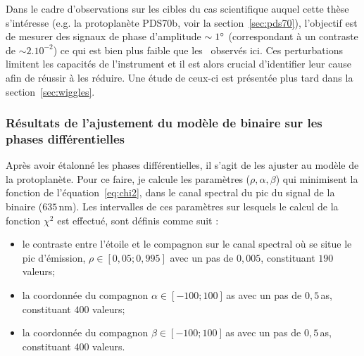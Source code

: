 Dans le cadre d'observations sur les cibles du cas scientifique auquel cette thèse s'intéresse (e.g. la protoplanète PDS70b, voir la section~\ref{sec:pds70}), l'objectif est de mesurer des signaux de phase d'amplitude $\sim 1^{\circ}$ (correspondant à un contraste de $\sim 2.10^{-2}$) ce qui est bien plus faible que les \wiggles~observés ici. Ces perturbations limitent les capacités de l'instrument et il est alors crucial d'identifier leur cause afin de réussir à les réduire. Une étude de ceux-ci est présentée plus tard dans la section~\ref{sec:wiggles}.


\subsubsection{Résultats de l'ajustement du modèle de binaire sur les phases différentielles}

Après avoir étalonné les phases différentielles, il s'agit de les ajuster au modèle de la protoplanète. Pour ce faire, je calcule les paramètres ($\rho, \alpha, \beta$) qui minimisent la fonction de l'équation~\ref{eq:chi2}, dans le canal spectral du pic du signal de la binaire ($635 \,$nm). Les intervalles de ces paramètres sur lesquels le calcul de la fonction $\chi^2$ est effectué, sont définis comme suit :

\begin{itemize}
    \item le contraste entre l'étoile et le compagnon sur le canal spectral où se situe le pic d'émission, $\rho \in [0,05; 0,995]$ avec un pas de $0,005$, constituant $190$ valeurs;
    \item la coordonnée du compagnon $\alpha \in [-100; 100]\,$as avec un pas de $0,5 \,$as, constituant $400$ valeurs;
    \item la coordonnée du compagnon $\beta \in [-100; 100]\,$as avec un pas de $0,5 \,$as, constituant $400$ valeurs.
\end{itemize}

